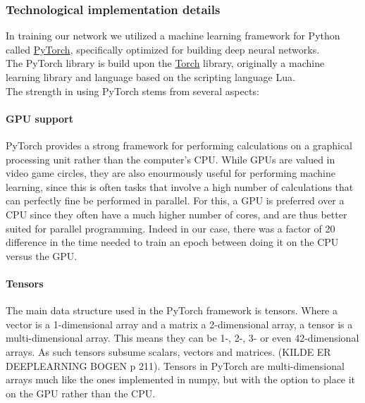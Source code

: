 \begin{multicols}{2}
\subsubsection{Technological implementation details}
In training our network we utilized a machine learning framework for Python called \href{https://pytorch.org/}{PyTorch}, specifically optimized for building deep neural networks. \\
The PyTorch library is build upon the \href{http://torch.ch/}{Torch} library, originally a machine learning library and language based on the scripting language Lua.\\
The strength in using PyTorch stems from several aspects:
\paragraph{GPU support}
PyTorch provides a strong framework for performing calculations on a graphical processing unit rather than the computer's CPU. While GPUs are valued in video game circles, they are also enourmously useful for performing machine learning, since this is often tasks that involve a high number of calculations that can perfectly fine be performed in parallel. For this, a GPU is preferred over a CPU since they often have a much higher number of cores, and are thus better suited for parallel programming. Indeed in our case, there was a factor of 20 difference in the time needed to train an epoch between doing it on the CPU versus the GPU.
\paragraph{Tensors}
The main data structure used in the PyTorch framework is tensors. Where a vector is a 1-dimensional array and a matrix a 2-dimensional array, a tensor is a multi-dimensional array. This means they can be 1-, 2-, 3- or even 42-dimensional arrays. As such tensors subsume scalars, vectors and matrices. (KILDE ER DEEPLEARNING BOGEN p 211). Tensors in PyTorch are multi-dimensional arrays much like the ones implemented in numpy, but with the option to place it on the GPU rather than the CPU.

\end{multicols}
